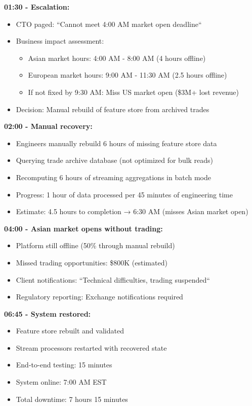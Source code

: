 \textbf{01:30 - Escalation:}
\begin{itemize}
    \item CTO paged: ``Cannot meet 4:00 AM market open deadline``
    \item Business impact assessment:
        \begin{itemize}
            \item Asian market hours: 4:00 AM - 8:00 AM (4 hours offline)
            \item European market hours: 9:00 AM - 11:30 AM (2.5 hours offline)
            \item If not fixed by 9:30 AM: Miss US market open (\$3M+ lost revenue)
        \end{itemize}
    \item Decision: Manual rebuild of feature store from archived trades
\end{itemize}

\textbf{02:00 - Manual recovery:}
\begin{itemize}
    \item Engineers manually rebuild 6 hours of missing feature store data
    \item Querying trade archive database (not optimized for bulk reads)
    \item Recomputing 6 hours of streaming aggregations in batch mode
    \item Progress: 1 hour of data processed per 45 minutes of engineering time
    \item Estimate: 4.5 hours to completion → 6:30 AM (misses Asian market open)
\end{itemize}

\textbf{04:00 - Asian market opens without trading:}
\begin{itemize}
    \item Platform still offline (50\% through manual rebuild)
    \item Missed trading opportunities: \$800K (estimated)
    \item Client notifications: ``Technical difficulties, trading suspended``
    \item Regulatory reporting: Exchange notifications required
\end{itemize}

\textbf{06:45 - System restored:}
\begin{itemize}
    \item Feature store rebuilt and validated
    \item Stream processors restarted with recovered state
    \item End-to-end testing: 15 minutes
    \item System online: 7:00 AM EST
    \item Total downtime: 7 hours 15 minutes
\end{itemize}

